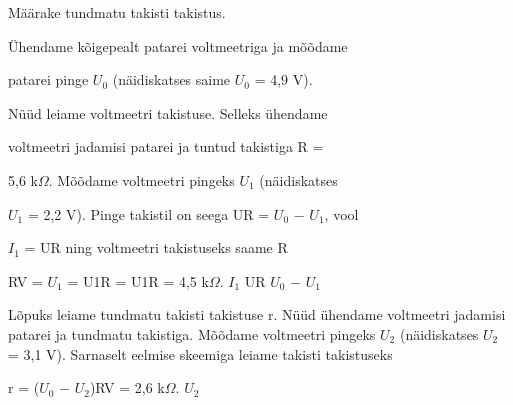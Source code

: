 
Määrake tundmatu takisti takistus.

\hint

\solu
Ühendame kõigepealt patarei voltmeetriga ja mõõdame

patarei pinge $U_0$ (näidiskatses saime $U_0$ = 4,9 V).

Nüüd leiame voltmeetri takistuse. Selleks ühendame

voltmeetri jadamisi patarei ja tuntud takistiga R =

5,6 k$\Omega$. Mõõdame voltmeetri pingeks $U_1$ (näidiskatses

$U_1$ = 2,2 V). Pinge takistil on seega UR = $U_0$ $-$ $U_1$, vool

$I_1$ = UR ning voltmeetri takistuseks saame R

RV = $U_1$ = U1R = U1R = 4,5 k$\Omega$. $I_1$ UR $U_0$ $-$ $U_1$

Lõpuks leiame tundmatu takisti takistuse r. Nüüd ühendame voltmeetri jadamisi patarei ja tundmatu takistiga. Mõõdame voltmeetri pingeks $U_2$ (näidiskatses $U_2$ = 3,1 V). Sarnaselt eelmise skeemiga leiame takisti takistuseks

r = ($U_0$ $-$ $U_2$)RV = 2,6 k$\Omega$. $U_2$
\probend
